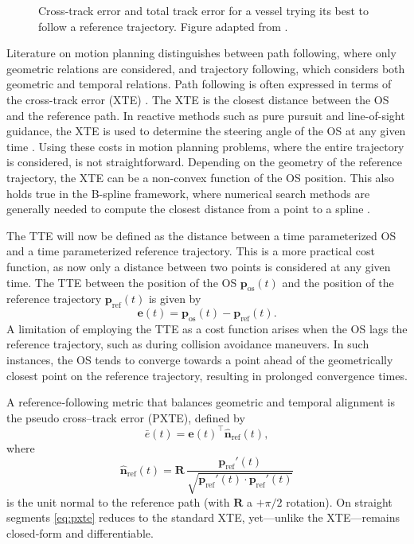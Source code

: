\begin{figure}
    \centering
    
    \caption{Cross-track error and total track error for a vessel trying its best to follow a reference trajectory. Figure adapted from \cite{prosjektoppgave}.}
    \label{fig:cross-track-along-track-error}
\end{figure}

Literature on motion planning distinguishes between path following, where only geometric relations are considered, and trajectory following, which considers both geometric and temporal relations. 
Path following is often expressed in terms of the cross-track error (XTE) \citep{Fossen2011-Handbook}. The XTE is the closest distance between the \acrshort{OS} and the reference path. In reactive methods such as pure pursuit and line-of-sight guidance, the XTE is used to determine the steering angle of the \acrshort{OS} at any given time \citep{Fossen2011-Handbook}. 
Using these costs in motion planning problems, where the entire trajectory is considered, is not straightforward. Depending on the geometry of the reference trajectory, the XTE can be a non-convex function of the OS position. This also holds true in the B-spline framework, where numerical search methods are generally needed to compute the closest distance from a point to a spline \citep{johnson2005distance,hu2005second,chen2009computing}.

The \acrfull{TTE} will now be defined as the distance between a time parameterized OS and a time parameterized reference trajectory. This is a more practical cost function, as now only a distance between two points is considered at any given time. The TTE between the position of the OS $\mathbf p_\text{os}(t)$ and the position of the reference trajectory $\mathbf p_\text{ref}(t)$ is given by
\begin{equation}\label{eq:total-track-error}
    \mathbf e(t) = \mathbf p_\text{os}(t) - \mathbf p_\text{ref}(t).
\end{equation}
A limitation of employing the TTE as a cost function arises when the OS lags the reference trajectory, such as during collision avoidance maneuvers. In such instances, the OS tends to converge towards a point ahead of the geometrically closest point on the reference trajectory, resulting in prolonged convergence times. 

A reference‐following metric that balances geometric and temporal alignment is the pseudo cross–track error (PXTE), defined by
\begin{equation}\label{eq:pxte}
  \bar e(t)
  = \mathbf e(t)^\top
    \mathbf{\hat n}_{\mathrm{ref}}(t),
\end{equation}
where
\begin{equation}\label{eq:reference-normal-pxte}
  \mathbf{\hat n}_{\mathrm{ref}}(t)
  = \mathbf R\,\frac{\mathbf p_{\mathrm{ref}}'(t)}{\sqrt{\mathbf p_{\mathrm{ref}}'(t) \cdot \mathbf p_{\mathrm{ref}}'(t)}}
\end{equation}
is the unit normal to the reference path (with $\mathbf R$ a $+\pi/2$ rotation).  On straight segments \cref{eq:pxte} reduces to the standard XTE, yet---unlike the XTE---remains closed‐form and differentiable.


